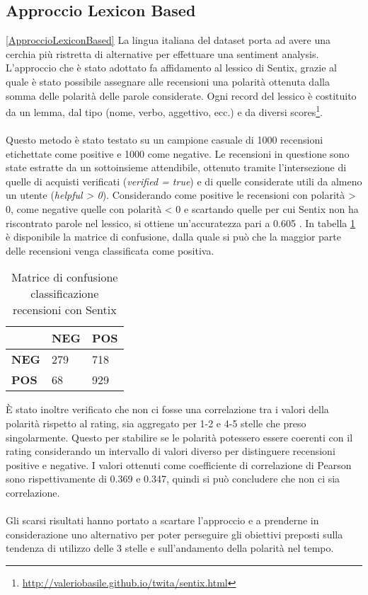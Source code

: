 \subsection{Approccio Lexicon Based}\ref{ApproccioLexiconBased}
La lingua italiana del dataset porta ad avere una cerchia più ristretta di alternative per effettuare una sentiment analysis. L'approccio che è stato adottato fa affidamento al lessico di Sentix, grazie al quale è stato possibile assegnare alle recensioni una polarità ottenuta dalla somma delle polarità delle parole considerate. Ogni record del lessico è costituito da un lemma, dal tipo (nome, verbo, aggettivo, ecc.) e da diversi scores\footnote{\url{http://valeriobasile.github.io/twita/sentix.html}}. 
\\\\
Questo metodo è stato testato su un campione casuale di 1000 recensioni etichettate come positive e 1000 come negative. Le recensioni in questione sono state estratte da un sottoinsieme attendibile, ottenuto tramite l'intersezione di quelle di acquisti verificati (\textit{verified = true}) e di quelle considerate utili da almeno un utente (\textit{helpful > 0}). Considerando come positive le recensioni con polarità > 0, come negative quelle con polarità < 0 e scartando quelle per cui Sentix non ha riscontrato parole nel lessico, si ottiene un'accuratezza pari a 0.605 . In tabella \ref{tab:matriceConfusione} è disponibile la matrice di confusione, dalla quale si può che la maggior parte delle recensioni venga classificata come positiva.

\begin{table}[]
    \centering
    \begin{tabular}{l|l|l|}
    \cline{2-3}
     & \textbf{NEG} & \textbf{POS} \\ \hline
    \multicolumn{1}{|l|}{\textbf{NEG}} & 279 & 718 \\ \hline
    \multicolumn{1}{|l|}{\textbf{POS}} & 68 & 929 \\ \hline
    \end{tabular}
    \caption{Matrice di confusione classificazione recensioni con Sentix}
    \label{tab:matriceConfusione}
\end{table}

È stato inoltre verificato che non ci fosse una correlazione tra i valori della polarità rispetto al rating, sia aggregato per 1-2 e 4-5 stelle che preso singolarmente. Questo per stabilire se le polarità potessero essere coerenti con il rating considerando un intervallo di valori diverso per distinguere recensioni positive e negative. I valori ottenuti come coefficiente di correlazione di Pearson sono rispettivamente di 0.369 e 0.347, quindi si può concludere che non ci sia correlazione.
\\\\
Gli scarsi risultati hanno portato a scartare l'approccio e a prenderne in considerazione uno alternativo per poter perseguire gli obiettivi preposti sulla tendenza di utilizzo delle 3 stelle e sull'andamento della polarità nel tempo.

